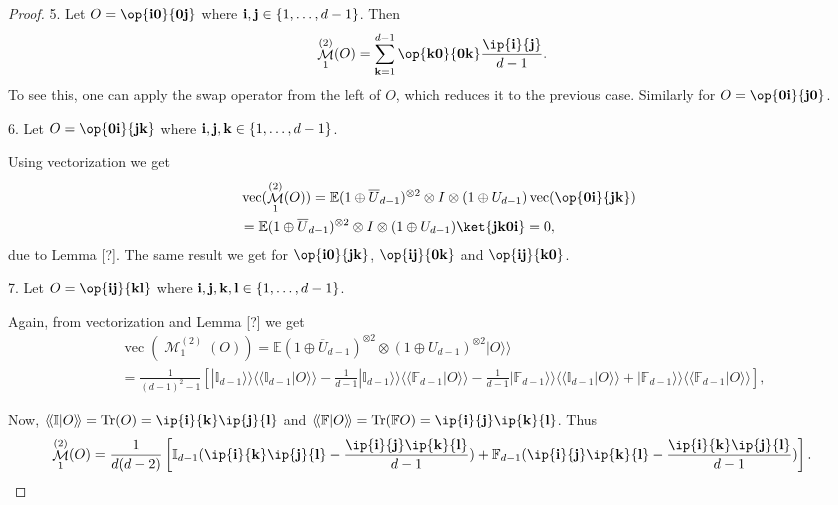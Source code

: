 \documentclass[pra,twocolumn,superscriptaddress,longbibliography]{revtex4-2}
\theoremstyle{remark}
\newcommand{\mcl}{\mathcal}
\newcommand{\mbb}{\mathbb}
\DeclareMathOperator{\tr}{Tr}
\DeclareMathOperator{\vect}{vec}
\DeclareMathOperator{\mom}{\mcl{M}}
\newcommand{\kket}[1]{|#1\rangle\!\rangle}
\newcommand{\bbrakket}[2]{\langle\!\langle#1 \rvert #2\rangle\!\rangle}
\numberwithin{equation}{section}
\begin{document}
\begin{proof}
5. Let $O = \op{\bf i0}{\bf 0j}$ where ${\bf i,j} \in \{1,\dots,d-1\}$. 
Then 
\begin{align*}
& \mom_1^{(2)}(O) 
= \sum_{{\bf k}=1}^{d-1}\op{\bf k0}{\bf 0k}\frac{\ip{\bf i}{\bf j}}{d-1}. 
\end{align*}
To see this, one can apply the swap operator from the left of $O$, 
which reduces it to the previous case. 
Similarly for $O = \op{\bf 0i}{\bf j0}$. 

6. Let $O = \op{\bf 0i}{\bf jk}$ where ${\bf i,j,k} \in \{1,\dots,d-1\}$. 

Using vectorization we get 
\begin{align*}
& \vect(\mom_1^{(2)}(O)) 
= \mbb{E}(1\oplus\overline{U}_{d-1})^{\otimes2}\otimes I \otimes (1\oplus{U}_{d-1}) \vect(\op{\bf 0i}{\bf jk}) \\
& = \mbb{E}(1\oplus\overline{U}_{d-1})^{\otimes2}\otimes I \otimes (1\oplus{U}_{d-1}) \ket{\bf jk0i} = 0, 
\end{align*}
due to Lemma [?]. The same result we get for 
$\op{\bf i0}{\bf jk}$, $\op{\bf ij}{\bf 0k}$ and $\op{\bf ij}{\bf k0}$. 

7. Let $O = \op{\bf ij}{\bf kl}$ where ${\bf i,j,k,l} \in \{1,\dots,d-1\}$. 

Again, from vectorization and Lemma [?] we get 
\begin{align*}
& \vect(\mom_1^{(2)}(O)) 
= \mbb{E}(1\oplus\overline{U}_{d-1})^{\otimes2}\otimes (1\oplus{U}_{d-1})^{\otimes2} \kket{O} \\
& = \frac{1}{(d-1)^2-1}\left[\kket{\mathbb{I}_{d-1}}\bbrakket{\mathbb{I}_{d-1}}{O}-\frac{1}{d-1}\kket{\mathbb{I}_{d-1}}\bbrakket{\mathbb{F}_{d-1}}{O}
-\frac{1}{d-1}\kket{\mathbb{F}_{d-1}}\bbrakket{\mathbb{I}_{d-1}}{O}+\kket{\mathbb{F}_{d-1}}\bbrakket{\mathbb{F}_{d-1}}{O}\right], 
\end{align*}

Now, $\bbrakket{\mathbb{I}}{O} = \tr(O) = \ip{\bf i}{\bf k}\ip{\bf j}{\bf l}$ and 
$\bbrakket{\mathbb{F}}{O} = \tr(\mbb{F}O) = \ip{\bf i}{\bf j}\ip{\bf k}{\bf l}$. 
Thus 
\begin{align*}
& \mom_1^{(2)}(O)
= \frac{1}{d(d-2)}\left[\mbb{I}_{d-1}(\ip{\bf i}{\bf k}\ip{\bf j}{\bf l} - \frac{\ip{\bf i}{\bf j}\ip{\bf k}{\bf l}}{d-1})
+ \mbb{F}_{d-1}(\ip{\bf i}{\bf j}\ip{\bf k}{\bf l} - \frac{\ip{\bf i}{\bf k}\ip{\bf j}{\bf l}}{d-1})\right].
\end{align*}


\end{proof}
\end{document}
